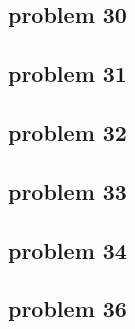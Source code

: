 \subsection{problem 30}


\subsection{problem 31}


\subsection{problem 32}


\subsection{problem 33}


\subsection{problem 34}


\subsection{problem 36}
